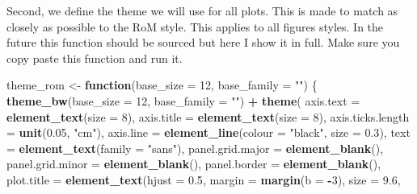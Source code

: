 \documentclass[]{article}
\newenvironment{Shaded}{\begin{snugshade}}{\end{snugshade}}
\newcommand{\KeywordTok}[1]{\textcolor[rgb]{0.13,0.29,0.53}{\textbf{#1}}}
\newcommand{\DataTypeTok}[1]{\textcolor[rgb]{0.13,0.29,0.53}{#1}}
\newcommand{\DecValTok}[1]{\textcolor[rgb]{0.00,0.00,0.81}{#1}}
\newcommand{\FloatTok}[1]{\textcolor[rgb]{0.00,0.00,0.81}{#1}}
\newcommand{\StringTok}[1]{\textcolor[rgb]{0.31,0.60,0.02}{#1}}
\newcommand{\ControlFlowTok}[1]{\textcolor[rgb]{0.13,0.29,0.53}{\textbf{#1}}}
\newcommand{\OperatorTok}[1]{\textcolor[rgb]{0.81,0.36,0.00}{\textbf{#1}}}
\newcommand{\NormalTok}[1]{#1}
\begin{document}
\begin{Shaded}
\end{Shaded}

Second, we define the theme we will use for all plots. This is made to
match as closely as possible to the RoM style. This applies to all
figures styles. In the future this function should be sourced but here I
show it in full. Make sure you copy paste this function and run it.

\begin{Shaded}
\begin{Highlighting}[]
\NormalTok{theme_rom <-}\StringTok{ }\ControlFlowTok{function}\NormalTok{(}\DataTypeTok{base_size =} \DecValTok{12}\NormalTok{, }\DataTypeTok{base_family =} \StringTok{""}\NormalTok{) \{}
  \KeywordTok{theme_bw}\NormalTok{(}\DataTypeTok{base_size =} \DecValTok{12}\NormalTok{, }\DataTypeTok{base_family =} \StringTok{""}\NormalTok{) }\OperatorTok{+}
\StringTok{    }\KeywordTok{theme}\NormalTok{(}
      \DataTypeTok{axis.text =} \KeywordTok{element_text}\NormalTok{(}\DataTypeTok{size =} \DecValTok{8}\NormalTok{), }
      \DataTypeTok{axis.title =} \KeywordTok{element_text}\NormalTok{(}\DataTypeTok{size =} \DecValTok{8}\NormalTok{),}
      \DataTypeTok{axis.ticks.length =} \KeywordTok{unit}\NormalTok{(}\FloatTok{0.05}\NormalTok{, }\StringTok{"cm"}\NormalTok{),}
      \DataTypeTok{axis.line =} \KeywordTok{element_line}\NormalTok{(}\DataTypeTok{colour =} \StringTok{"black"}\NormalTok{,}
                               \DataTypeTok{size =} \FloatTok{0.3}\NormalTok{), }
      \DataTypeTok{text =} \KeywordTok{element_text}\NormalTok{(}\DataTypeTok{family =} \StringTok{"sans"}\NormalTok{),}
      \DataTypeTok{panel.grid.major =} \KeywordTok{element_blank}\NormalTok{(),}
      \DataTypeTok{panel.grid.minor =} \KeywordTok{element_blank}\NormalTok{(),}
      \DataTypeTok{panel.border =} \KeywordTok{element_blank}\NormalTok{(),}
      \DataTypeTok{plot.title =} \KeywordTok{element_text}\NormalTok{(}\DataTypeTok{hjust =} \FloatTok{0.5}\NormalTok{, }
                                \DataTypeTok{margin =} \KeywordTok{margin}\NormalTok{(}\DataTypeTok{b =} \OperatorTok{-}\DecValTok{3}\NormalTok{), }
                                \DataTypeTok{size =} \FloatTok{9.6}\NormalTok{, }

\end{Highlighting}
\end{Shaded}
\end{document}
